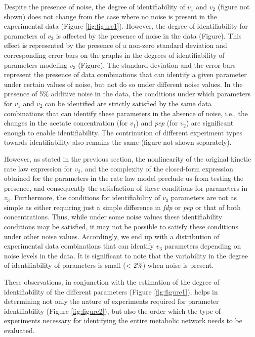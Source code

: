\documentclass[10pt]{article}
\begin{document}
Despite the presence of noise, the degree of identifiability of $v_1$ and $v_2$ (figure not shown) does not change from the case where no noise is present in the experimental data (Figure \ref{fig:figure1}). However, the degree of identifiability for parameters of $v_3$ is affected by the presence of noise in the data (Figure). This effect is represented by the presence of a non-zero standard deviation and corresponding error bars on the graphs in the degrees of identifiability of parameters modeling $v_3$ (Figure). The standard deviation and the error bars represent the presence of data combinations that can identify a given parameter under certain values of noise, but not do so under different noise values. In the presence of 5\% additive noise in the data, the conditions under which parameters for $v_1$ and $v_2$ can be identified are strictly satisfied by the same data combinations that can identify these parameters in the absence of noise, i.e., the changes in the acetate concentration (for $v_1$) and \textit{pep} (for $v_2$) are significant enough to enable identifiability. The contrinution of different experiment types towards identifiability also remains the same (figure not shown separately).

However, as stated in the previous section, the nonlinearity of the original kinetic rate law expression for $v_3$, and the complexity of the closed-form expression obtained for the parameters in the rate law model preclude us from testing the presence, and consequently the satisfaction of these conditions for parameters in $v_3$. Furthermore, the conditions for identifiability of $v_3$ parameters are not as simple as either requiring just a simple difference in \textit{fdp} or \textit{pep} or that of both concentrations. Thus, while under some noise values these identifiability conditions may be satisfied, it may not be possible to satisfy these conditions under other noise values. Accordingly, we end up with a distribution of experimental data combinations that can identify $v_3$ parameters depending on noise levels in the data. It is significant to note that the variability in the degree of identifiability of parameters is small (< 2\%) when noise is present.

These observations, in conjunction with the estimation of the degree of identifiability of the different parameters (Figure \ref{fig:figure1}), helps in determining not only the nature of experiments required for parameter identifiability (Figure \ref{fig:figure2}), but also the order which the type of experiments necessary for identifying the entire metabolic network needs to be evaluated.
\end{document}
